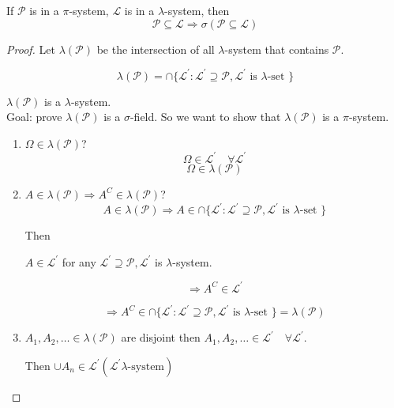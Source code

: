\documentclass[11pt,fleqn]{book} %
\begin{document}
\begin{theorem}
	If $\mathscr{P}$ is in a $\pi$-system, $\mathscr{L}$ is in a $\lambda$-system, then 
	$$\mathscr{P} \subseteq \mathscr{L} \Rightarrow \sigma(\mathscr{P} \subseteq \mathscr{L}) $$
\end{theorem}

\begin{proof}
	Let $\lambda(\mathscr{P})$ be the intersection of all $\lambda$-system that contains $\mathscr{P}$. 

		$$ \lambda(\mathscr{P}) = \cap\{\mathscr{L}^\prime: \mathscr{L}^\prime \supseteq \mathscr{P}, \mathscr{L}^\prime \text{ is }\lambda\text{-set }\}$$

	$\lambda(\mathscr{P})$ is a $\lambda$-system.\\

	Goal: prove $\lambda(\mathscr{P})$ is a $\sigma$-field.
	So we want to show that $\lambda(\mathscr{P})$ is a $\pi$-system.

	\begin{enumerate}
		\item $\Omega \in \lambda(\mathscr{P})$?\\

			$$\Omega \in \mathscr{L}^\prime \quad \forall \mathscr{L}^\prime$$
			$$\Omega \in \lambda(\mathscr{P}) $$

		\item $A \in \lambda(\mathscr{P}) \Rightarrow A^C \in \lambda(\mathscr{P})$?\\

		$$A \in \lambda(\mathscr{P}) \Rightarrow A \in \cap\{\mathscr{L}^\prime: \mathscr{L}^\prime \supseteq \mathscr{P}, \mathscr{L}^\prime \text{ is }\lambda\text{-set }\} $$

		Then 

		$A \in \mathscr{L}^\prime$ for any $\mathscr{L}^\prime \supseteq \mathscr{P}, \mathscr{L}^\prime$ is $\lambda$-system. 

		$$\Rightarrow A^C \in \mathscr{L}^\prime $$

		$$\Rightarrow A^C \in  \cap\{\mathscr{L}^\prime: \mathscr{L}^\prime \supseteq \mathscr{P}, \mathscr{L}^\prime \text{ is }\lambda\text{-set }\} = \lambda(\mathscr{P})$$

		\item $A_1, A_2, \dots \in \lambda(\mathscr{P})$ are disjoint then $A_1, A_2, \dots \in \mathscr{L}^\prime \quad \forall \mathscr{L}^\prime$. 

		Then $\cup A_n \in \mathscr{L}^\prime (\mathscr{L}^\prime \lambda\text{-system})$


\end{enumerate}
\end{proof}
\end{document}
